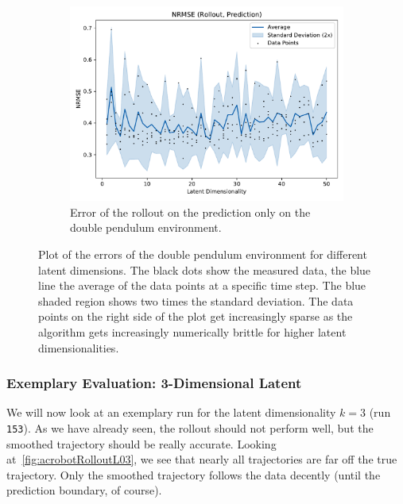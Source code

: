 \begin{figure}
\begin{subfigure}{0.5\linewidth}
					\label{fig:acrobotRmseTrain}
				\end{subfigure}%
				~
				\begin{subfigure}{0.5\linewidth}
					\centering
					\includegraphics[width=\linewidth]{figures/results/acrobot-gym/latent-dim/comparison-rmse-rollout-prediction-normalized-mean-vs-latent-dim.pdf}
					\caption{Error of the rollout on the prediction only on the double pendulum environment.}
					\label{fig:acrobotRmsePred}
				\end{subfigure}
				\caption{Plot of the errors of the double pendulum environment for different latent dimensions. The black dots show the measured data, the blue line the average of the data points at a specific time step. The blue shaded region shows two times the standard deviation. The data points on the right side of the plot get increasingly sparse as the algorithm gets increasingly numerically brittle for higher latent dimensionalities.}
				\label{fig:acrobotRmse}
			\end{figure}

		\subsubsection{Exemplary Evaluation: 3-Dimensional Latent}
			We will now look at an exemplary run for the latent dimensionality \( k = 3 \) (run \texttt{153}). As we have already seen, the rollout should not perform well, but the smoothed trajectory should be really accurate. Looking at~\autoref{fig:acrobotRolloutL03}, we see that nearly all trajectories are far off the true trajectory. Only the smoothed trajectory follows the data decently (until the prediction boundary, of course).

